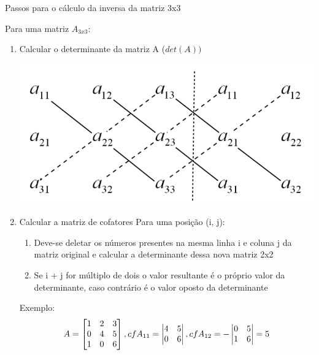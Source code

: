 \documentclass[10pt]{beamer}
\begin{document}
\begin{frame}[fragile]{Passos para o cálculo da inversa da matriz 3x3}
  
  Para uma matriz $A_{3x3}$:
  \begin{enumerate}
  \item Calcular o determinante da matriz A ($det(A))$
  
  \begin{center}
    \includegraphics[scale=0.15]{images/determinante.png}  
  \end{center}
  
  \item Calcular a matriz de cofatores \newline
  Para uma posição (i, j):
    \begin{enumerate}
      \item Deve-se deletar os números presentes na mesma linha i e coluna j da matriz original e calcular a determinante dessa nova matriz 2x2
      \item Se i + j for múltiplo de dois o valor resultante é o próprio valor da determinante, caso contrário é o valor oposto da determinante
    \end{enumerate}
  Exemplo: 
    \[
    A = \begin{bmatrix}
      1 & 2 & 3 \\
      0 & 4 & 5 \\
      1 & 0 & 6
    \end{bmatrix}, 
    cfA_{11} = \begin{vmatrix}
      4 & 5 \\ 
      0 & 6 \notag
    \end{vmatrix}, 
    cfA_{12} = -\begin{vmatrix}
      0 & 5 \\ 
      1 & 6 \notag
    \end{vmatrix}
    =
    5    
    \]
  \end{enumerate}

\end{frame}
\end{document}
